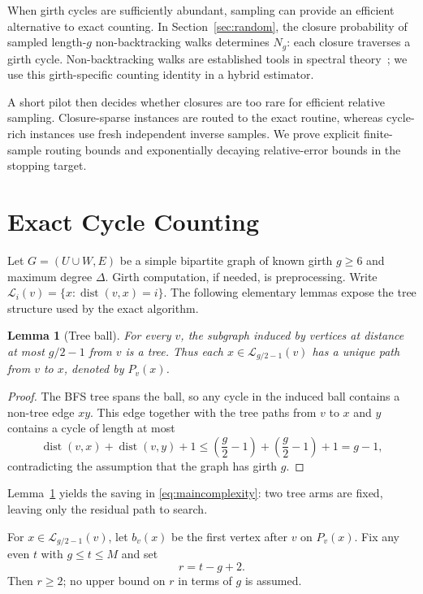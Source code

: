 \documentclass[conference]{IEEEtran}
\newtheorem{lemma}{Lemma}
\newcommand{\dist}{\operatorname{dist}}
\newcommand{\cL}{\mathcal{L}}
\begin{document}
When girth cycles are sufficiently abundant, sampling can provide
an efficient alternative to exact counting. In Section~\ref{sec:random}, the closure probability of sampled length-$g$
non-backtracking walks determines $N_g$: each closure traverses a girth cycle.
Non-backtracking walks are established tools in spectral
theory~\cite{bass1992};
we use this girth-specific counting identity in a hybrid estimator.

A short pilot then decides whether closures are too rare for efficient
relative sampling. Closure-sparse instances are routed to the exact routine,
whereas cycle-rich instances use fresh independent inverse samples. We prove explicit finite-sample
routing bounds and exponentially decaying relative-error bounds in the
stopping target.

\section{Exact Cycle Counting}\label{sec:exact}
Let $G=(U\cup W,E)$ be a simple bipartite graph of known girth $g\ge6$
and maximum degree $\Delta$. Girth computation, if needed, is preprocessing.
Write $\cL_i(v)=\{x:\dist(v,x)=i\}$. The following elementary lemmas expose
the tree structure used by the exact algorithm.

\begin{lemma}[Tree ball]\label{lem:tree}
For every $v$, the subgraph induced by vertices at distance at most $g/2-1$
from $v$ is a tree. Thus each $x\in\cL_{g/2-1}(v)$ has a unique
path from $v$ to $x$, denoted by $P_v(x)$.
\end{lemma}
\begin{proof}
The BFS tree spans the ball, so any cycle in the induced ball contains a
non-tree edge $xy$. This edge together with the tree paths from $v$ to $x$
and $y$ contains a cycle of length at most
\[
\dist(v,x)+\dist(v,y)+1\le
\left(\frac{g}{2}-1\right)+\left(\frac{g}{2}-1\right)+1
=g-1,
\]
contradicting the assumption that the graph has girth $g$.
\end{proof}

Lemma~\ref{lem:tree} yields the saving in
\eqref{eq:maincomplexity}: two tree arms are fixed,
leaving only the residual path to search.

For $x\in\cL_{g/2-1}(v)$, let $b_v(x)$ be the first vertex after $v$ on
$P_v(x)$.  Fix any even $t$ with $g\le t\le M$ and set
\begin{equation}\label{eq:rdef}
 r=t-g+2.
\end{equation}
Then $r\ge2$; no upper bound on $r$ in terms of $g$ is assumed.
\end{document}
